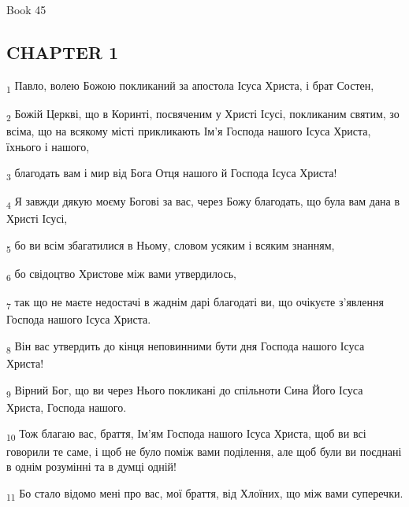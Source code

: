 Book 45
\subsection{CHAPTER 1}
\begin{tcolorbox}
\textsubscript{1} Павло, волею Божою покликаний за апостола Ісуса Христа, і брат Состен,
\end{tcolorbox}
\begin{tcolorbox}
\textsubscript{2} Божій Церкві, що в Коринті, посвяченим у Христі Ісусі, покликаним святим, зо всіма, що на всякому місті прикликають Ім'я Господа нашого Ісуса Христа, їхнього і нашого,
\end{tcolorbox}
\begin{tcolorbox}
\textsubscript{3} благодать вам і мир від Бога Отця нашого й Господа Ісуса Христа!
\end{tcolorbox}
\begin{tcolorbox}
\textsubscript{4} Я завжди дякую моєму Богові за вас, через Божу благодать, що була вам дана в Христі Ісусі,
\end{tcolorbox}
\begin{tcolorbox}
\textsubscript{5} бо ви всім збагатилися в Ньому, словом усяким і всяким знанням,
\end{tcolorbox}
\begin{tcolorbox}
\textsubscript{6} бо свідоцтво Христове між вами утвердилось,
\end{tcolorbox}
\begin{tcolorbox}
\textsubscript{7} так що не маєте недостачі в жаднім дарі благодаті ви, що очікуєте з'явлення Господа нашого Ісуса Христа.
\end{tcolorbox}
\begin{tcolorbox}
\textsubscript{8} Він вас утвердить до кінця неповинними бути дня Господа нашого Ісуса Христа!
\end{tcolorbox}
\begin{tcolorbox}
\textsubscript{9} Вірний Бог, що ви через Нього покликані до спільноти Сина Його Ісуса Христа, Господа нашого.
\end{tcolorbox}
\begin{tcolorbox}
\textsubscript{10} Тож благаю вас, браття, Ім'ям Господа нашого Ісуса Христа, щоб ви всі говорили те саме, і щоб не було поміж вами поділення, але щоб були ви поєднані в однім розумінні та в думці одній!
\end{tcolorbox}
\begin{tcolorbox}
\textsubscript{11} Бо стало відомо мені про вас, мої браття, від Хлоїних, що між вами суперечки.
\end{tcolorbox}
